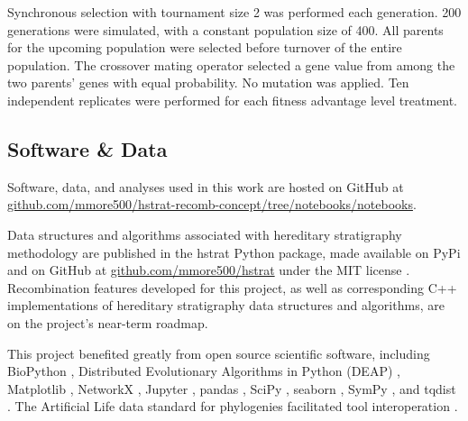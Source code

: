 Synchronous selection with tournament size 2 was performed each generation.
200 generations were simulated, with a constant population size of 400.
All parents for the upcoming population were selected before turnover of the entire population.
The crossover mating operator selected a gene value from among the two parents' genes with equal probability.
No mutation was applied.
Ten independent replicates were performed for each fitness advantage level treatment.

\subsection{Software \& Data}
\label{sec:software-data}

Software, data, and analyses used in this work are hosted on GitHub at \url{github.com/mmore500/hstrat-recomb-concept/tree/notebooks/notebooks}.

Data structures and algorithms associated with hereditary stratigraphy methodology are published in the hstrat Python package, made available on PyPi and on GitHub at \url{github.com/mmore500/hstrat} under the MIT license \citep{moreno2022hstrat}.
Recombination features developed for this project, as well as corresponding C++ implementations of hereditary stratigraphy data structures and algorithms, are on the project's near-term roadmap.

This project benefited greatly from open source scientific software, including BioPython \citep{cock2009biopython}, Distributed Evolutionary Algorithms in Python (DEAP) \citep{fortin2012deap}, Matplotlib \citep{hunter2007matplotlib}, NetworkX \citep{hagberg2008networkx}, Jupyter \citep{loizides2016jupyter}, pandas \citep{reback2020pandas,mckinney2010pandas}, SciPy \citep{pauli2020scipy}, seaborn \citep{waskom2021seaborn}, SymPy \citep{meurer2017sympy}, and tqdist \citep{sand2014tqdist}.
The Artificial Life data standard for phylogenies facilitated tool interoperation \citep{lalejini2019data}.
